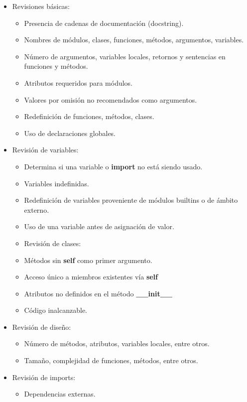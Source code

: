 \begin{itemize}
  \item Revisiones básicas:
    \begin{itemize}
    \item Presencia de cadenas de documentación (docstring).
    \item Nombres de módulos, clases, funciones, métodos, argumentos, variables.
    \item Número de argumentos, variables locales, retornos y sentencias en funciones y métodos.
    \item Atributos requeridos para módulos.
    \item Valores por omisión no recomendados como argumentos.
    \item Redefinición de funciones, métodos, clases.
    \item Uso de declaraciones globales.
    \end{itemize}
  \item Revisión de variables:
    \begin{itemize}
    \item Determina si una variable o \textbf{import} no está siendo usado.
    \item Variables indefinidas.
    \item Redefinición de variables proveniente de módulos builtins o de ámbito externo.
    \item Uso de una variable antes de asignación de valor.
    \item Revisión de clases:
    \item Métodos sin \textbf{self} como primer argumento.
    \item Acceso único a miembros existentes vía \textbf{self}
    \item Atributos no definidos en el método \textbf{\_\_init\_\_}
    \item Código inalcanzable.
    \end{itemize}
  \item Revisión de diseño:
    \begin{itemize}
    \item Número de métodos, atributos, variables locales, entre otros.
    \item Tamaño, complejidad de funciones, métodos, entre otros.
    \end{itemize}
  \item Revisión de imports:
    \begin{itemize}
    \item Dependencias externas.

\end{itemize}
\end{itemize}
